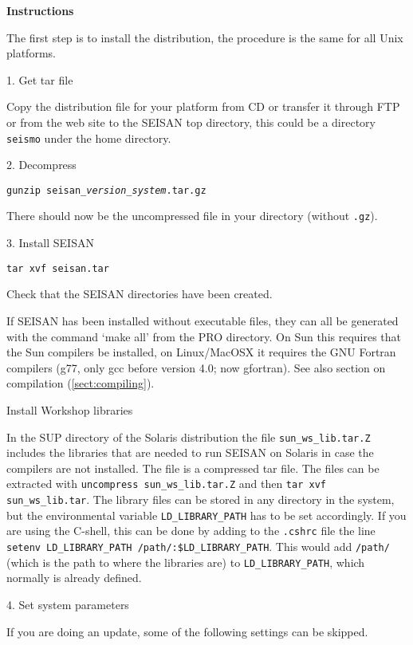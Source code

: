 \textbf{Instructions}

The first step is to install the distribution, the procedure is the same for all Unix platforms. 

1.  Get tar file 

Copy the distribution file for your platform from CD or transfer it 
through FTP or from the web site to the SEISAN top directory, 
this could be a directory \texttt{seismo} under the home directory. 

2.  Decompress 

\texttt{gunzip seisan\_\textit{version}\_\textit{system}.tar.gz}

There should now be the uncompressed file in your directory (without \texttt{.gz}). 

3. Install SEISAN 

\texttt{tar xvf seisan.tar}

Check that the SEISAN directories have been created. 

If SEISAN has been installed without executable files, they can all be generated with the command `make all' from the PRO directory. On Sun this requires that the Sun compilers be installed, on Linux/MacOSX it requires the GNU Fortran compilers (g77, only gcc before version 4.0; now gfortran). See also section on compilation (\ref{sect:compiling}). 

Install Workshop libraries 

In the SUP directory of the Solaris distribution the file 
\texttt{sun\_ws\_lib.tar.Z} 
includes the libraries that are needed to run SEISAN on Solaris in 
case the compilers are not installed. The file is a compressed tar file. 
The files can be extracted with \texttt{uncompress sun\_ws\_lib.tar.Z} 
and then \texttt{tar xvf sun\_ws\_lib.tar}. The library files can be 
stored in any directory in the system, but the environmental 
variable \texttt{LD\_LIBRARY\_PATH}
 has to be set accordingly. 
If you are using the C-shell, this can be done by adding to 
the \texttt{.cshrc} file the line 
\texttt{setenv LD\_LIBRARY\_PATH /path/:\$LD\_LIBRARY\_PATH}. 
This would add \texttt{/path/} (which is the path to where the libraries are) 
to \texttt{LD\_LIBRARY\_PATH}, which normally is already defined. 

4. Set system parameters 

If you are doing an update, some of the following settings can be skipped. 

